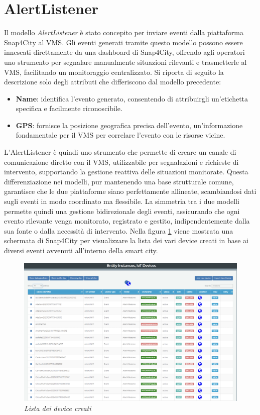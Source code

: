 \documentclass[a4paper, openright, thesis]{report}
\begin{document}
\section{AlertListener}
Il modello \textit{AlertListener} è stato concepito per inviare eventi dalla piattaforma Snap4City al VMS. Gli eventi generati tramite questo modello possono essere innescati direttamente da una dashboard di Snap4City, offrendo agli operatori uno strumento per segnalare manualmente situazioni rilevanti e trasmetterle al VMS, facilitando un monitoraggio centralizzato. Si riporta di seguito la descrizione solo degli attributi che differiscono dal modello precedente:
\begin{itemize}
\item\textbf{Name}: identifica l’evento generato, consentendo di attribuirgli un’etichetta specifica e facilmente riconoscibile.
\item\textbf{GPS}: fornisce la posizione geografica precisa dell'evento, un'informazione fondamentale per il VMS per correlare l'evento con le risorse vicine.
\end{itemize}
\noindent
L’AlertListener è quindi uno strumento che permette di creare un canale di comunicazione diretto con il VMS, utilizzabile per segnalazioni e richieste di intervento, supportando la gestione reattiva delle situazioni monitorate.
\noindent
Questa differenziazione nei modelli, pur mantenendo una base strutturale comune, garantisce che le due piattaforme siano perfettamente allineate, scambiandosi dati sugli eventi in modo coordinato ma flessibile. La simmetria tra i due modelli permette quindi una gestione bidirezionale degli eventi, assicurando che ogni evento rilevante venga monitorato, registrato e gestito, indipendentemente dalla sua fonte o dalla necessità di intervento.
Nella figura \ref{13} viene mostrata una schermata di Snap4City per visualizzare la lista dei vari device creati in base ai diversi eventi avvenuti all'interno della smart city.
\begin{figure}[H]
    \centering
    \includegraphics[width=1\linewidth]{img/DeviceListing.png}
    \caption{\textit{ Lista dei device creati}}
    \label{13}
\end{figure}
\end{document}
